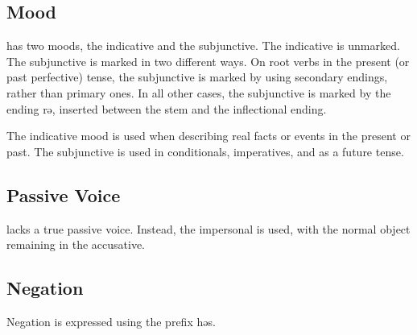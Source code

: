 \subsection{Mood}
\Langname{} has two moods, the indicative and the subjunctive. The indicative
is unmarked. The subjunctive is marked in two different ways. On root verbs in
the present (or past perfective) tense, the subjunctive is marked by using
secondary endings, rather than primary ones. In all other cases, the
subjunctive is marked by the ending {\ll rə}, inserted between the stem and the
inflectional ending.

The indicative mood is used when describing real facts or events in the present
or past. The subjunctive is used in conditionals, imperatives, and as a future
tense.

\subsection{Passive Voice}
\Langname{} lacks a true passive voice. Instead, the impersonal is used, with
the normal object remaining in the accusative.

\subsection{Negation}
Negation is expressed using the prefix {\ll həs}.

